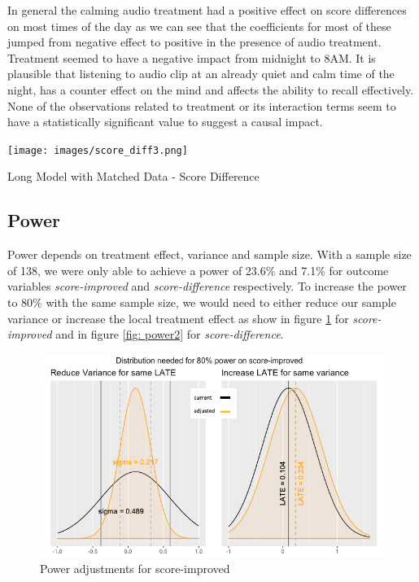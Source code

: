 \documentclass[journal,onecolumn, 12pt]{article}
\begin{document}
\noindent
In general the calming audio treatment had a positive effect on score differences on most times of the day as we can see that the coefficients for most of these jumped from negative effect to positive in the presence of audio treatment. Treatment seemed to have a negative impact from midnight to 8AM. It is plausible that listening to audio clip at an already quiet and calm time of the night, has a counter effect on the mind and affects the ability to recall effectively. None of the observations related to treatment or its interaction terms seem to have a statistically significant value to suggest a causal impact.

\begin{table}[h]
    \centering
    \texttt{[image: images/score\_diff3.png]}
    \caption{Long Model with Matched Data - Score Difference}
    \label{table: scorediff3}
\end{table}

\subsection {Power}

Power depends on treatment effect, variance and sample size. With a sample size of 138, we were only able to achieve a power of 23.6\% and 7.1\% for outcome variables \textit{score-improved} and \textit{score-difference} respectively. To increase the power to 80\% with the same sample size, we would need to either reduce our sample variance or increase the local treatment effect as show in figure \ref{fig: power1} for \textit{score-improved} and in figure \ref{fig: power2} for \textit{score-difference}.
\begin{figure}[h]
    \centering
    \includegraphics[scale=0.6]{images/power1.png} 
    \caption{Power adjustments for score-improved}
    \label{fig: power1}
\end{figure}
    
\end{document}
